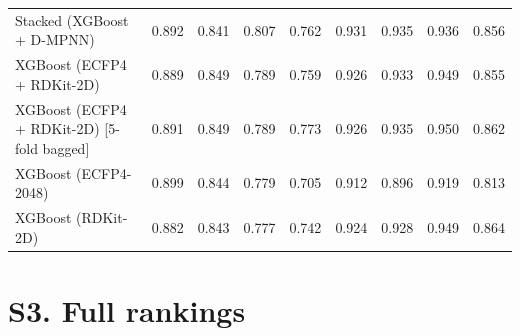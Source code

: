 \documentclass[11pt]{article}
\begin{document}
\begin{landscape}
{\begin{longtable}{lcccccccc}
Stacked (XGBoost + D-MPNN) & 0.892 & 0.841 & 0.807 & 0.762 & 0.931 & 0.935 & 0.936 & 0.856 \\
XGBoost (ECFP4 + RDKit-2D) & 0.889 & 0.849 & 0.789 & 0.759 & 0.926 & 0.933 & 0.949 & 0.855 \\
XGBoost (ECFP4 + RDKit-2D) [5-fold bagged] & 0.891 & 0.849 & 0.789 & 0.773 & 0.926 & 0.935 & 0.950 & 0.862 \\
XGBoost (ECFP4-2048) & 0.899 & 0.844 & 0.779 & 0.705 & 0.912 & 0.896 & 0.919 & 0.813 \\
XGBoost (RDKit-2D) & 0.882 & 0.843 & 0.777 & 0.742 & 0.924 & 0.928 & 0.949 & 0.864 \\
\bottomrule
\end{longtable}}
\end{landscape}

\section*{S3. Full rankings}
\end{document}
